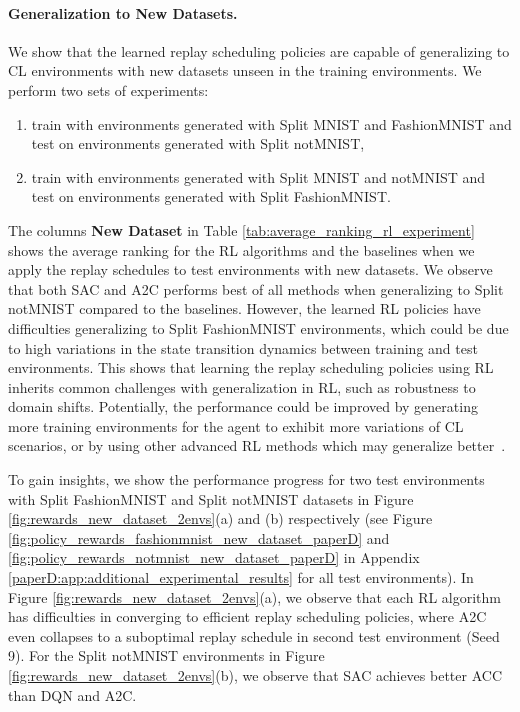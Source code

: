 \paragraph{Generalization to New Datasets.}
We show that the learned replay scheduling policies are capable of generalizing to CL environments with new datasets unseen in the training environments. We perform two sets of experiments:
\begin{enumerate}[topsep=1pt]
	\item train with environments generated with Split MNIST and FashionMNIST and test on environments generated with Split notMNIST,
	\item train with environments generated with Split MNIST and notMNIST and test on environments generated with Split FashionMNIST.
\end{enumerate}
The columns \textbf{New Dataset} in Table \ref{tab:average_ranking_rl_experiment} shows the average ranking for the RL algorithms and the baselines when we apply the replay schedules to test environments with new datasets. We observe that both SAC and A2C performs best of all methods when generalizing to Split notMNIST compared to the baselines. However, the learned RL policies have difficulties generalizing to Split FashionMNIST environments, which could be due to high variations in the state transition dynamics between training and test environments. This shows that learning the replay scheduling policies using RL inherits common challenges with generalization in RL, such as robustness to domain shifts. Potentially, the performance could be improved by generating more training environments for the agent to exhibit more variations of CL scenarios, or by using other advanced RL methods which may generalize better~.

To gain insights, we show the performance progress for two test environments with Split FashionMNIST and Split notMNIST datasets in Figure \ref{fig:rewards_new_dataset_2envs}(a) and (b) respectively (see Figure \ref{fig:policy_rewards_fashionmnist_new_dataset_paperD} and \ref{fig:policy_rewards_notmnist_new_dataset_paperD} in Appendix \ref{paperD:app:additional_experimental_results} for all test environments). 
In Figure \ref{fig:rewards_new_dataset_2envs}(a), we observe that each RL algorithm has difficulties in converging to efficient replay scheduling policies, where A2C even collapses to a suboptimal replay schedule in second test environment (Seed 9). For the Split notMNIST environments in Figure \ref{fig:rewards_new_dataset_2envs}(b), we observe that SAC achieves better ACC than DQN and A2C. 


